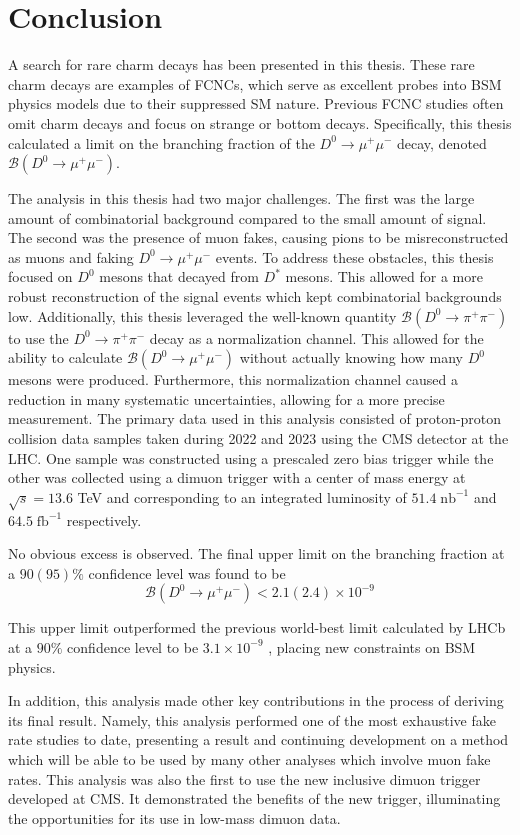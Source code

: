 \chapter{Conclusion}
\label{ch:5}

\vspace{-5mm}

A search for rare charm decays has been presented in this thesis. These rare charm decays are examples of FCNCs, which serve as excellent probes into BSM physics models due to their suppressed SM nature. Previous FCNC studies often omit charm decays and focus on strange or bottom decays. Specifically, this thesis calculated a limit on the branching fraction of the $D^0 \to \mu^+ \mu^-$ decay, denoted $\mathcal{B}(D^0 \to \mu^+ \mu^-)$. 

The analysis in this thesis had two major challenges. The first was the large amount of combinatorial background compared to the small amount of signal. The second was the presence of muon fakes, causing pions to be misreconstructed as muons and faking $D^0 \to \mu^+ \mu^-$ events. To address these obstacles, this thesis focused on $D^0$ mesons that decayed from $D^*$ mesons. This allowed for a more robust reconstruction of the signal events which kept combinatorial backgrounds low. Additionally, this thesis leveraged the well-known quantity $\mathcal{B}(D^0 \to \pi^+ \pi^-)$ to use the $D^0 \to \pi^+ \pi^-$ decay as a normalization channel. This allowed for the ability to calculate $\mathcal{B}(D^0 \to \mu^+ \mu^-)$ without actually knowing how many $D^0$ mesons were produced. Furthermore, this normalization channel caused a reduction in many systematic uncertainties, allowing for a more precise measurement. The primary data used in this analysis consisted of proton-proton collision data samples taken during 2022 and 2023 using the CMS detector at the LHC. One sample was constructed using a prescaled zero bias trigger while the other was collected using a dimuon trigger with a center of mass energy at $\sqrt{s} = 13.6$ TeV and corresponding to an integrated luminosity of $51.4\; \text{nb}^{-1}$ and $64.5\; \text{fb}^{-1}$ respectively. 

No obvious excess is observed. The final upper limit on the branching fraction at a $90(95)\%$ confidence level was found to be 
\begin{equation}
    \mathcal{B}(D^0 \to \mu^+ \mu^-) < 2.1(2.4) \times 10^{-9} 
\end{equation} 

This upper limit outperformed the previous world-best limit calculated by LHCb at a $90\%$ confidence level to be $3.1 \times 10^{-9}$ \cite{ref:lhcb_2023}, placing new constraints on BSM physics.

In addition, this analysis made other key contributions in the process of deriving its final result. Namely, this analysis performed one of the most exhaustive fake rate studies to date, presenting a result and continuing development on a method which will be able to be used by many other analyses which involve muon fake rates. This analysis was also the first to use the new inclusive dimuon trigger developed at CMS. It demonstrated the benefits of the new trigger, illuminating the opportunities for its use in low-mass dimuon data. 